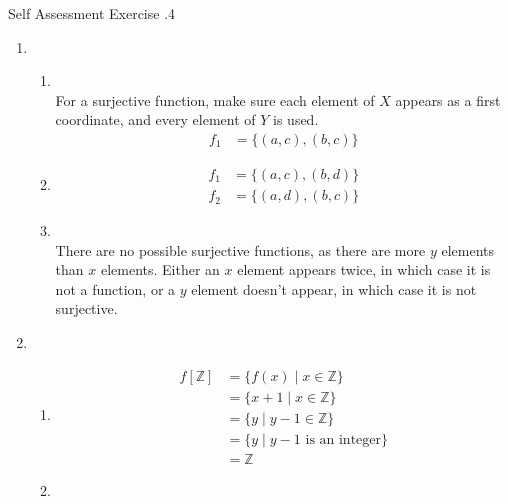 \documentclass[\main/notes.tex]{subfiles}
\begin{document}
			\begin{exercise}{Self Assessment Exercise \thechapter.4}
				\begin{enumerate}
					\item {}
						\begin{enumerate}[label=(\alph*)]
							\item {}\\
								For a surjective function, make sure each element of $X$ appears as a first coordinate, and every element of $Y$ is used.
								\begin{align*}
									f_{1} &= \bigl\{(a, c), (b, c)\bigr\}
								\end{align*}
							\item {}
								\begin{align*}
									f_{1} &= \bigl\{(a, c), (b, d)\bigr\}\\
									f_{2} &= \bigl\{(a, d), (b, c)\bigr\}
								\end{align*}
							\item {}\\
								There are no possible surjective functions, as there are more $y$ elements than $x$ elements. Either an $x$ element appears twice, in which case it is not a function, or a $y$ element doesn't appear, in which case it is not surjective.
						\end{enumerate}
					\item {}
						\begin{enumerate}[label=(\alph*)]
							\item {}
								\begin{align*}
									f[\mathbb{Z}] &= \{f(x) \mid x \in \mathbb{Z}\}\\
									&= \{x + 1 \mid x \in \mathbb{Z}\} \tag*{$(y = x + 1 \Rightarrow x = y - 1)$}\\
									&= \{y \mid y - 1 \in \mathbb{Z}\}\\
									&= \{y \mid y - 1 \text{ is an integer}\}\\
									&= \mathbb{Z}
								\end{align*}
							\item {}\\

\end{enumerate}
\end{enumerate}
\end{exercise}
\end{document}
